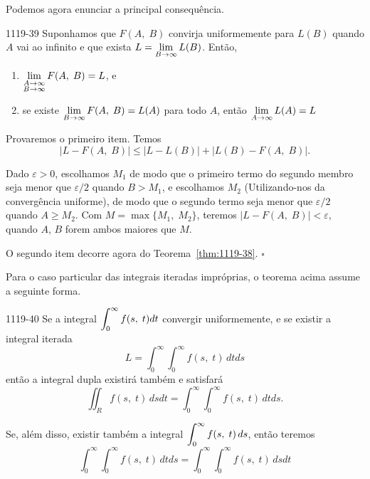 Podemos agora enunciar a principal consequência.

\begin{theoc}{}{1119-39}
Suponhamos que $F (A,\; B)$ convirja uniformemente para $L(B)$
quando $A$ vai ao infinito e que exista $\displaystyle{L =
\lim_{B\to\infty}L(B)}$. Então,
\begin{enumerate}[label=(\arabic*)]
\item $\displaystyle{\lim_{\substack{A\to\infty\\B\to\infty}}F(A,\; B) = L}$, e
\item se existe $\displaystyle{\lim_{B\to\infty}F(A,\; B)=L(A)}$ para todo $A$, então
$\displaystyle{ \lim_{A\to\infty}L(A)=L}$
\end{enumerate}
\end{theoc}

\prova Provaremos o primeiro item. Temos
\begin{equation*}
  |L - F(A,\; B)|\leq |L - L(B)| + |L(B) - F(A,\; B)|.
\end{equation*}

Dado $\varepsilon> 0$, escolhamos $M_1$ de modo que o primeiro
termo do segundo membro seja menor que $\varepsilon/2$ quando $B >
M_1$, e escolhamos $M_2$ (Utilizando-nos da convergência
uniforme), de modo que o segundo termo seja menor que
$\varepsilon/2$ quando $A\geq M_2$. Com $M =\max\{M_1,\; M_2\}$,
teremos $|L - F(A,\; B)| < \varepsilon$, quando $A$, $B$ forem ambos
maiores que $M$.

O segundo item  decorre agora do Teorema~\ref{thm:1119-38}.\hfill
$\square$

Para o caso particular das integrais iteradas impróprias, o teorema acima assume a seguinte forma.
\begin{theoc}{}{1119-40}
Se a integral $\displaystyle{\int_0^\infty f(s,\; t) dt}$ convergir
uniformemente, e se existir a integral iterada
\begin{equation*}
  L = \int_0^\infty\int_0^\infty f (s,\; t) \,dtds
\end{equation*}
então a integral dupla existirá também e satisfará
\begin{equation*}
  \iint_{R}f(s,\; t)\,dsdt=\int_0^\infty\int_0^\infty f(s,\; t)\,dtds.
\end{equation*}

Se, além disso, existir também a integral $\displaystyle{\int_0^\infty f(s,\; t)\, ds}$, então teremos
\begin{equation*}
  \int_0^\infty \int_0^\infty f(s,\; t)\, dtds=\int_0^\infty\int_0^\infty f(s,\; t)\,dsdt
\end{equation*}
\end{theoc}

